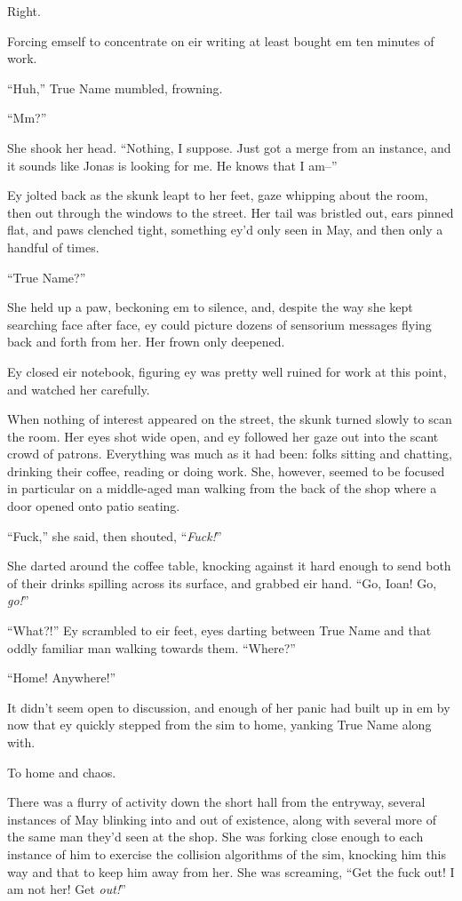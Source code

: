 Right.

Forcing emself to concentrate on eir writing at least bought em ten minutes of work.

``Huh,'' True Name mumbled, frowning.

``Mm?''

She shook her head. ``Nothing, I suppose. Just got a merge from an instance, and it sounds like Jonas is looking for me. He knows that I am--''

Ey jolted back as the skunk leapt to her feet, gaze whipping about the room, then out through the windows to the street. Her tail was bristled out, ears pinned flat, and paws clenched tight, something ey'd only seen in May, and then only a handful of times.

``True Name?''

She held up a paw, beckoning em to silence, and, despite the way she kept searching face after face, ey could picture dozens of sensorium messages flying back and forth from her. Her frown only deepened.

Ey closed eir notebook, figuring ey was pretty well ruined for work at this point, and watched her carefully.

When nothing of interest appeared on the street, the skunk turned slowly to scan the room. Her eyes shot wide open, and ey followed her gaze out into the scant crowd of patrons. Everything was much as it had been: folks sitting and chatting, drinking their coffee, reading or doing work. She, however, seemed to be focused in particular on a middle-aged man walking from the back of the shop where a door opened onto patio seating.

``Fuck,'' she said, then shouted, ``\emph{Fuck!}''

She darted around the coffee table, knocking against it hard enough to send both of their drinks spilling across its surface, and grabbed eir hand. ``Go, Ioan! Go, \emph{go!}''

``What?!'' Ey scrambled to eir feet, eyes darting between True Name and that oddly familiar man walking towards them. ``Where?''

``Home! Anywhere!''

It didn't seem open to discussion, and enough of her panic had built up in em by now that ey quickly stepped from the sim to home, yanking True Name along with.

To home and chaos.

There was a flurry of activity down the short hall from the entryway, several instances of May blinking into and out of existence, along with several more of the same man they'd seen at the shop. She was forking close enough to each instance of him to exercise the collision algorithms of the sim, knocking him this way and that to keep him away from her. She was screaming, ``Get the fuck out! I am not her! Get \emph{out!}''

